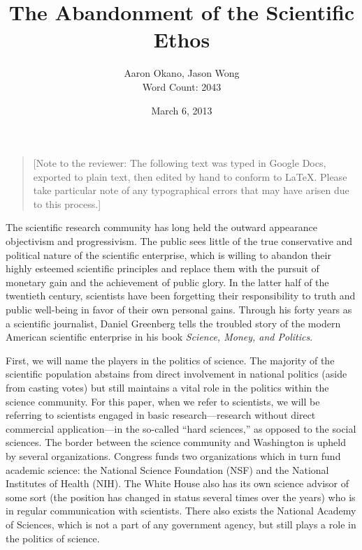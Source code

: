 \documentclass{article}[12pt]
\title{The Abandonment of the Scientific Ethos}  %
\author{Aaron Okano, Jason Wong\\Word Count: 2043 }    %
\date{March 6, 2013}   %
\begin{document}

\maketitle                 %

\begin{quote}
  [Note to the reviewer: The following text was typed in Google Docs, exported
    to plain text, then edited by hand to conform to \LaTeX. Please take
    particular note of any typographical errors that may have arisen due to
  this process.]
\end{quote}

﻿The scientific research community has long held the outward appearance
objectivism and progressivism. The public sees little of the true conservative
and political nature of the scientific enterprise, which is willing to abandon
their highly esteemed scientific principles and replace them with the pursuit
of monetary gain and the achievement of public glory. In the latter half of the
twentieth century, scientists have been forgetting their responsibility to
truth and public well-being in favor of their own personal gains. Through his
forty years as a scientific journalist, Daniel Greenberg tells the troubled
story of the modern American scientific enterprise in his book \emph{Science,
Money, and Politics}.

First, we will name the players in the politics of science. The majority of the
scientific population abstains from direct involvement in national politics
(aside from casting votes) but still maintains a vital role in the politics
within the science community. For this paper, when we refer to scientists, we
will be referring to scientists engaged in basic research---research without
direct commercial application---in the so-called ``hard sciences,'' as opposed
to the social sciences. The border between the science community and Washington
is upheld by several organizations. Congress funds two organizations which in
turn fund academic science: the National Science Foundation (NSF) and the
National Institutes of Health (NIH). The White House also has its own science
advisor of some sort (the position has changed in status several times over the
years) who is in regular communication with scientists. There also exists the
National Academy of Sciences, which is not a part of any government agency, but
still plays a role in the politics of science.
\end{document}
